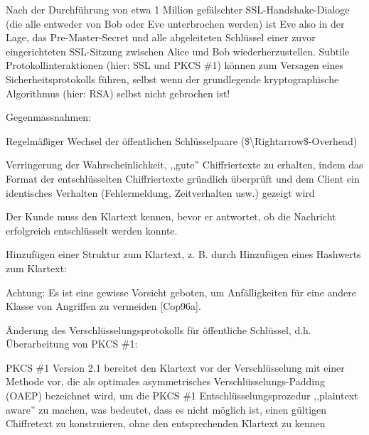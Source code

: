 \documentclass[a4paper]{article}
\begin{document}
\begin{multicols}{3}
\begin{itemize*}
\begin{itemize*}
\begin{itemize*}
                        \item Nach der Durchführung von etwa 1 Million gefälschter SSL-Handshake-Dialoge (die alle entweder von Bob oder Eve unterbrochen werden) ist Eve also in der Lage, das Pre-Master-Secret und alle abgeleiteten Schlüssel einer zuvor eingerichteten SSL-Sitzung zwischen Alice und Bob wiederherzustellen. Subtile Protokollinteraktionen (hier: SSL und PKCS \#1) können zum Versagen eines Sicherheitsprotokolls führen, selbst wenn der grundlegende kryptographische Algorithmus (hier: RSA) selbst nicht gebrochen ist!
                  \end{itemize*}
                  \item
                  Gegenmassnahmen:

                  \begin{itemize*}
                        \item Regelmäßiger Wechsel der öffentlichen Schlüsselpaare (\$\textbackslash Rightarrow\$-Overhead)
                        \item Verringerung der Wahrscheinlichkeit, ,,gute'' Chiffriertexte zu erhalten, indem das Format der entschlüsselten Chiffriertexte gründlich überprüft und dem Client ein identisches Verhalten (Fehlermeldung, Zeitverhalten usw.) gezeigt wird
                        \item Der Kunde muss den Klartext kennen, bevor er antwortet, ob die Nachricht erfolgreich entschlüsselt werden konnte.
                        \item Hinzufügen einer Struktur zum Klartext, z. B. durch Hinzufügen eines Hashwerts zum Klartext:
                        \begin{itemize*} \item Achtung: Es ist eine gewisse Vorsicht geboten, um Anfälligkeiten für eine andere Klasse von Angriffen zu vermeiden {[}Cop96a{]}. \end{itemize*}
                        \item Änderung des Verschlüsselungsprotokolls für öffentliche Schlüssel, d.h. Überarbeitung von PKCS \#1:
                        \begin{itemize*} \item PKCS \#1 Version 2.1 bereitet den Klartext vor der Verschlüsselung mit einer Methode vor, die als optimales asymmetrisches Verschlüsselungs-Padding (OAEP) bezeichnet wird, um die PKCS \#1 Entschlüsselungsprozedur ,,plaintext aware'' zu machen, was bedeutet, dass es nicht möglich ist, einen gültigen Chiffretext zu konstruieren, ohne den entsprechenden Klartext zu kennen \end{itemize*}
                  \end{itemize*}
            \end{itemize*}



\end{itemize*}
\end{multicols}
\end{document}
